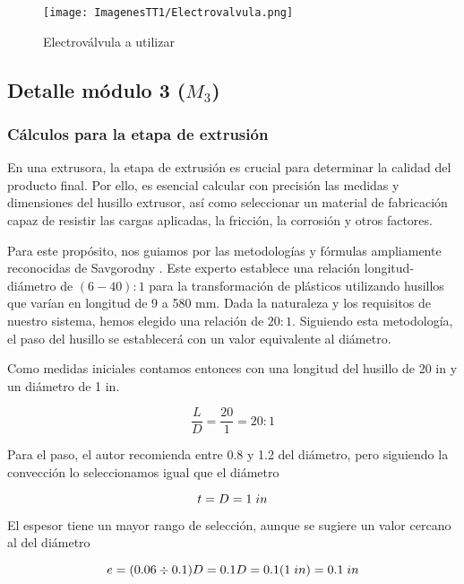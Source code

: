 \documentclass[14pt,oneside]{extarticle} %
\begin{document}
\begin{figure}[H]
    \centering
    \texttt{[image: ImagenesTT1/Electrovalvula.png]}
    \caption{Electroválvula a utilizar}
    \label{fig:electrovalvula}
\end{figure}

\subsection{Detalle módulo 3 ($M_3$)}

\subsubsection{Cálculos para la etapa de extrusión}

En una extrusora, la etapa de extrusión es crucial para determinar la calidad del producto final. Por ello, es esencial calcular con precisión las medidas y dimensiones del husillo extrusor, así como seleccionar un material de fabricación capaz de resistir las cargas aplicadas, la fricción, la corrosión y otros factores.

Para este propósito, nos guiamos por las metodologías y fórmulas ampliamente reconocidas de Savgorodny \cite{Savgorodny}. Este experto establece una relación longitud-diámetro de $(6-40):1$ para la transformación de plásticos utilizando husillos que varían en longitud de 9 a 580 mm. Dada la naturaleza y los requisitos de nuestro sistema, hemos elegido una relación de $20:1$. Siguiendo esta metodología, el paso del husillo se establecerá con un valor equivalente al diámetro.

Como medidas iniciales contamos entonces con una longitud del husillo de 20 in y un diámetro de 1 in.

\begin{equation*}
    \frac{L}{D}=\frac{20}{1}=20:1
\end{equation*}

Para el paso, el autor recomienda entre 0.8 y 1.2 del diámetro, pero siguiendo la convección lo seleccionamos igual que el diámetro

\begin{equation*}
    t=D=1\hspace{0.1cm}in
\end{equation*}

El espesor tiene un mayor rango de selección, aunque se sugiere un valor cercano al del diámetro

\begin{equation*}
    e=(0.06\div0.1)D=0.1D=0.1(1\hspace{0.1cm}in)=0.1\hspace{0.1cm}in
\end{equation*}
\end{document}
